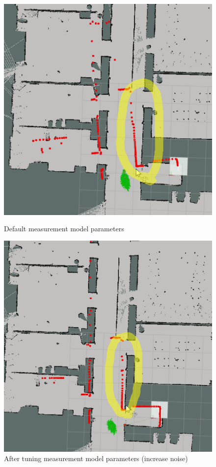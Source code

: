 \documentclass[12pt]{article}
\begin{document}
\begin{figure}[!tb]
    \includegraphics[width=\linewidth]{param1.png}
    \caption{Default measurement model parameters}
    \label{fig:param1}
\endminipage\hfill
{}
  \includegraphics[width=\linewidth]{param2.png}
  \caption{After tuning measurement model parameters (increase noise)}
  \label{fig:param2}
\endminipage\hfill
\end{figure}
\end{document}
